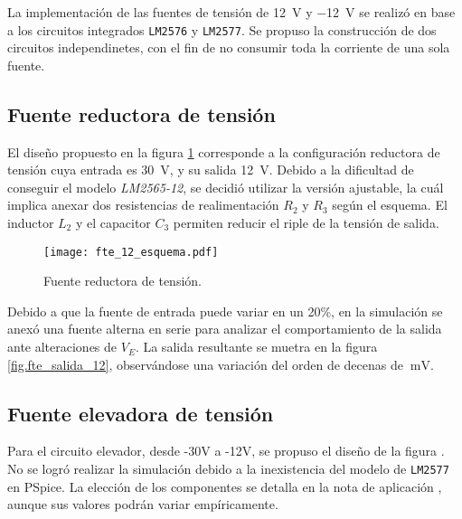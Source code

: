 La implementación de las fuentes de tensión de \SI{12}{\volt} y \SI{-12}{\volt} se realizó en base a los circuitos integrados \texttt{LM2576} y \texttt{LM2577}. Se propuso la construcción de dos circuitos independinetes, con el fin de no consumir toda la corriente de una sola fuente.

\subsection{Fuente reductora de tensión}
El diseño propuesto en la figura \ref{fig.fte_12} corresponde a la configuración reductora de tensión cuya entrada es \SI{+30}{\volt}, y su salida \SI{+12}{\volt}. Debido a la dificultad de conseguir el modelo \textit{LM2565-12}, se decidió utilizar la versión ajustable, la cuál implica anexar dos resistencias de realimentación $R_2$ y $R_3$ según el esquema. El inductor $L_2$ y el capacitor $C_3$ permiten reducir el riple de la tensión de salida.


\begin{figure}
	\centering
	\texttt{[image: fte\_12\_esquema.pdf]}
	\caption{Fuente reductora de tensión.}
	\label{fig.fte_12}
\end{figure}


Debido a que la fuente de entrada puede variar en un 20\%, en la simulación se anexó una fuente alterna en serie para analizar el comportamiento de la salida ante alteraciones de $V_E$. La salida resultante se muetra en la figura \ref{fig.fte_salida_12}, observándose una variación del orden de decenas de $\SI{}{\milli\volt}$.



\subsection{Fuente elevadora de tensión}

Para el circuito elevador, desde -30V a -12V, se propuso el diseño de la figura . 
No se logró realizar la simulación debido a la inexistencia del modelo de   \texttt{LM2577} en PSpice. 
La elección de los componentes se detalla en la nota de aplicación , aunque sus valores podrán variar empíricamente.


